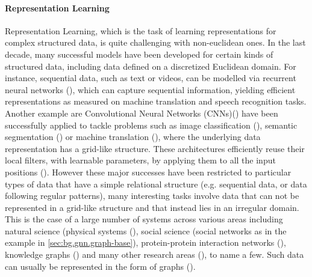\documentclass[binding=0.6cm]{sapthesis}
\newcommand{\mycite}[1]{(\cite{#1})}
\begin{document}
\paragraph{Representation Learning}
\label{sec:bg.gnn.repr-learning}
Representation Learning, which is the task of learning representations for complex structured data, is quite challenging with non-euclidean ones. In the last decade, many successful models have been developed for certain kinds of structured data, including data defined on a discretized Euclidean domain. For instance, sequential data, such as text or videos, can be modelled via recurrent neural networks \mycite{TEAlab2018334}, which can capture sequential information, yielding efficient representations as measured on machine translation and speech recognition tasks. Another example are Convolutional Neural Networks (CNNs)\mycite{Lecun1998cnn} have been successfully applied to tackle problems such as image classification (\cite{venkatesan2017convolutional}), semantic segmentation (\cite{jégou2017layers}) or machine translation (\cite{gehring2017convolutional}), where the underlying data representation has a grid-like structure. These architectures efficiently reuse their local filters, with learnable parameters, by applying them to all the input positions \mycite{LeCun2015DeepL}. However these major successes have been restricted to particular types of data that have a simple relational structure (e.g. sequential data, or data following regular patterns), many interesting tasks involve data that can not be represented in a grid-like structure and that instead lies in an irregular domain. This is the case of a large number of systems across various areas including natural science (physical systems (\cite{pmlr-v80-sanchez-gonzalez18a}), social science (social networks as in the example in \cref{sec:bg.gnn.graph-base}), protein-protein interaction networks (\cite{nips2017_PPI}), knowledge graphs (\cite{ijcai2017p250}) and many other research areas (\cite{nips2017_combOpt}), to name a few. Such data can usually be represented in the form of graphs \mycite{veličković2018gat}.

\end{document}
